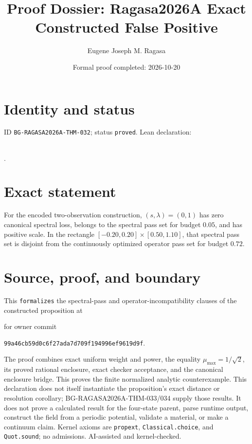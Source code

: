 \documentclass[11pt]{article}
\title{Proof Dossier: Ragasa2026A Exact Constructed False Positive}\author{Eugene Joseph M. Ragasa}\date{Formal proof completed: 2026-10-20}
\begin{document}
\maketitle
\section{Identity and status}
ID \texttt{BG-RAGASA2026A-THM-032}; status \texttt{proved}. Lean declaration:
\par{}\\
{\tiny{}}.
\section{Exact statement}
For the encoded two-observation construction, $(s,\lambda)=(0,1)$ has zero canonical
spectral loss, belongs to the spectral pass set for budget $0.05$, and has positive scale.
In the rectangle $[-0.20,0.20]\times[0.50,1.10]$, that spectral pass set is disjoint from
the continuously optimized operator pass set for budget $0.72$.
\section{Source, proof, and boundary}
This \texttt{formalizes} the spectral-pass and operator-incompatibility clauses of the
constructed proposition at
\begin{center}\small{}\end{center}
for owner commit
\begin{center}\small\texttt{99a46cb59d0c6f27ada7d709f194996ef9619d9f}.\end{center}
The proof combines exact uniform weight
and power, the equality $\mu_{\max}=1/\sqrt{2}$, its proved rational enclosure, exact
checker acceptance, and the canonical enclosure bridge. This proves the finite normalized
analytic counterexample. This declaration does not itself instantiate the proposition's
exact distance or resolution corollary; BG-RAGASA2026A-THM-033/034 supply those results.
It does not prove a calculated result for the four-state parent,
parse runtime output, construct the field from a periodic potential, validate a material,
or make a continuum claim. Kernel axioms are \texttt{propext},
\texttt{Classical.choice}, and \texttt{Quot.sound}; no admissions. AI-assisted and
kernel-checked.
\end{document}

